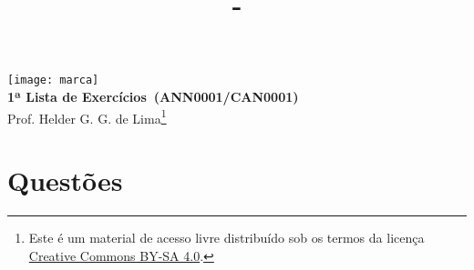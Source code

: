 \documentclass[12pt,a4paper]{article}
\author{\eu}
\title{\tipo - \disciplina}
\date{\data}
\newcommand{\IconPc}{\texttt{[image: computer.png]}}
\newcommand{\IconCalc}{\texttt{[image: calculator.png]}}
\newcommand{\IconThink}{\texttt{[image: pencil.png]}}
\newcommand{\IconCheck}{\texttt{[image: checkmark.png]}}
\newlength{\SmileysLength}
\newcommand{\calc}{\hspace*{-\SmileysLength}\makebox[0pt][r]{\IconCalc}%
   \hspace*{\SmileysLength}}
\newcommand{\software}{\hspace*{-\SmileysLength}\makebox[0pt][r]{\IconPc}%
   \hspace*{\SmileysLength}}
\newcommand{\teoria}{\hspace*{-\SmileysLength}\makebox[0pt][r]{\IconThink}%
   \hspace*{\SmileysLength}}
\newcommand{\conceito}{\hspace*{-\SmileysLength}\makebox[0pt][r]{\IconCheck}%
   \hspace*{\SmileysLength}}
\newcommand*\tipo{1ª Lista de Exercícios}
\newcommand*\disciplina{ANN0001/CAN0001}
\newcommand*\eu{Helder G. G. de Lima}
\begin{document}
\begin{center}
\texttt{[image: marca]} \\
\textbf{\tipo\ (\disciplina)} \\
Prof. \eu\footnote{
Este é um material de acesso livre distribuído sob os termos da licença \href{https://creativecommons.org/licenses/by-sa/4.0/deed.pt_BR}{Creative Commons BY-SA 4.0}.}
\end{center}


\section*{Questões}
\end{document}

